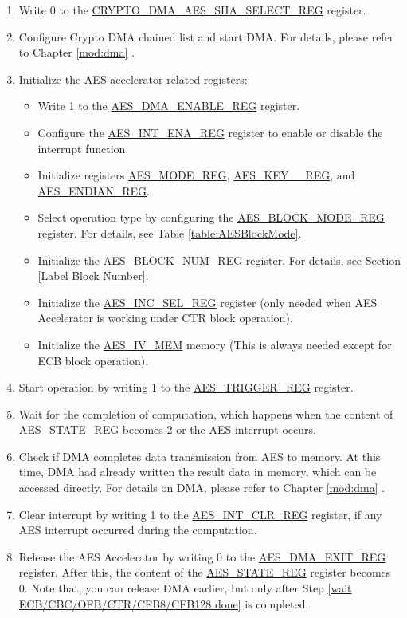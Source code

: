 \documentclass[main\_\_EN.tex]{subfiles}
\begin{document}
\begin{enumerate}
    \item Write 0 to the \hyperref[regdesc:CRYPTODMAAESSHASELECTREG]{CRYPTO\_DMA\_AES\_SHA\_SELECT\_REG} register.
    \item Configure Crypto DMA chained list and start DMA. For details, please refer to Chapter \ref{mod:dma} \textit{}.
    \item Initialize the AES accelerator-related registers:
    \begin{itemize}
        \item Write 1 to the \hyperref[regdesc:AESDMAENABLEREG]{AES\_DMA\_ENABLE\_REG} register.
        \item Configure the \hyperref[regdesc:AESINTENAREG]{AES\_INT\_ENA\_REG} register to enable or disable the interrupt function.
        \item Initialize registers \hyperref[regdesc:AESMODEREG]{AES\_MODE\_REG}, \hyperref[regdesc:AESKEYnREG]{AES\_KEY\_\_REG}, and \hyperref[regdesc:AESENDIANREG]{AES\_ENDIAN\_REG}.
        \item Select operation type by configuring the \hyperref[regdesc:AESBLOCKMODEREG]{AES\_BLOCK\_MODE\_REG} register. For details, see Table \ref{table:AESBlockMode}.
        \item Initialize the \hyperref[regdesc:AESBLOCKNUMREG]{AES\_BLOCK\_NUM\_REG} register. For details, see Section \ref{Label Block Number}.
        \item Initialize the \hyperref[regdesc:AESINCSELREG]{AES\_INC\_SEL\_REG} register (only needed when AES Accelerator is working under CTR block operation).
        \item Initialize the \hyperref[memdesc:AESIVMEM]{AES\_IV\_MEM} memory (This is always needed except for ECB block operation).
    \end{itemize}
    \item Start operation by writing 1 to the \hyperref[regdesc:AESTRIGGERREG]{AES\_TRIGGER\_REG} register.
    \item \label{wait ECB/CBC/OFB/CTR/CFB8/CFB128 done}
            Wait for the completion of computation, which happens when the content of \hyperref[regdesc:AESSTATEREG]{AES\_STATE\_REG} becomes 2 or the AES interrupt occurs.
    \item Check if DMA completes data transmission from AES to memory. At this time, DMA had already written the result data in memory, which can be accessed directly. For details on DMA, please refer to Chapter \ref{mod:dma} \textit{}.
    \item Clear interrupt by writing 1 to the \hyperref[regdesc:AESINTCLRREG]{AES\_INT\_CLR\_REG} register, if any AES interrupt occurred during the computation.
    \item Release the AES Accelerator by writing 0 to the \hyperref[regdesc:AESDMAEXITREG]{AES\_DMA\_EXIT\_REG} register. After this, the content of the \hyperref[regdesc:AESSTATEREG]{AES\_STATE\_REG} register becomes 0.
    Note that, you can release DMA earlier, but only after Step \ref{wait ECB/CBC/OFB/CTR/CFB8/CFB128 done} is completed.
\end{enumerate}
\end{document}
